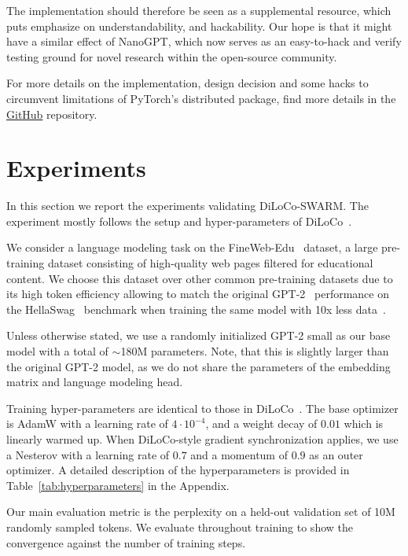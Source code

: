 \documentclass[conference, 10pt]{IEEEtran}
\begin{document}
The implementation should therefore be seen as a supplemental resource, which
puts emphasize on understandability, and hackability. Our hope is that it might
have a similar effect of NanoGPT, which now serves as an easy-to-hack and verify
testing ground for novel research within the open-source community.

For more details on the implementation, design decision and some hacks to
circumvent limitations of PyTorch's distributed package, find more details in
the \href{https://github.com/mikasenghaas/swarm}{GitHub} repository.

\section{Experiments}

In this section we report the experiments validating DiLoCo-SWARM. The experiment
mostly follows the setup and hyper-parameters of DiLoCo~\cite{douillard2023}.

We consider a language modeling task on the FineWeb-Edu~\cite{penedo2024}
dataset, a large pre-training dataset consisting of high-quality web pages
filtered for educational content. We choose this dataset over other common
pre-training datasets due to its high token efficiency allowing to match the
original GPT-2~\cite{radford2019} performance on the
HellaSwag~\cite{zellers2019} benchmark when training the same model with 10x
less data~\cite{karpathy2024}.

Unless otherwise stated, we use a randomly initialized GPT-2 small as our base
model with a total of $\sim$180M parameters. Note, that this is slightly larger
than the original GPT-2 model, as we do not share the parameters of the embedding
matrix and language modeling head.

Training hyper-parameters are identical to those in DiLoCo~\cite{douillard2023}.
The base optimizer is AdamW with a learning rate of $4\cdot 10^{-4}$, and a
weight decay of $0.01$ which is linearly warmed up. When DiLoCo-style gradient
synchronization applies, we use a Nesterov with a learning rate of $0.7$ and a
momentum of $0.9$ as an outer optimizer. A detailed description of the
hyperparameters is provided in Table~\ref{tab:hyperparameters} in the Appendix.

Our main evaluation metric is the perplexity on a held-out validation set of 10M
randomly sampled tokens. We evaluate throughout training to show the convergence
against the number of training steps.
\end{document}
